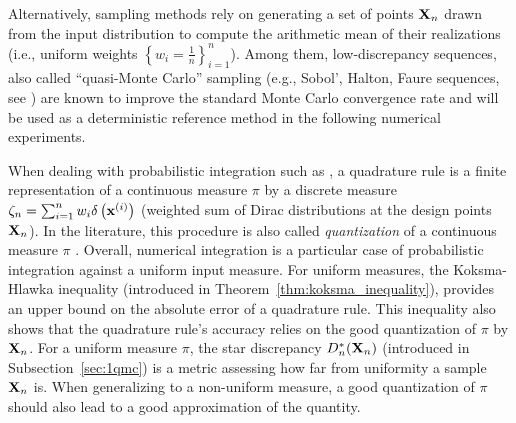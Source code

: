 Alternatively, sampling methods rely on generating a set of points ${\bf X}_n$ drawn from the input distribution to compute the arithmetic mean of their realizations (i.e., uniform weights $\left\{w_i = \frac1n \right\}_{i=1}^n$). 
Among them, low-discrepancy sequences, also called ``quasi-Monte Carlo'' sampling (e.g., Sobol', Halton, Faure sequences, see \citealp{leobacher_2014}) are known to improve the standard Monte Carlo convergence rate and will be used as a deterministic reference method in the following numerical experiments.

When dealing with probabilistic integration such as , a quadrature rule is a finite representation of a continuous measure $\pi$ by a discrete measure $\zeta_n = \sum_{i=1}^n w_i \delta\left({\bf x}^{(i)}\right)$ (weighted sum of Dirac distributions at the design points ${\bf X}_n$).
In the literature, this procedure is also called \emph{quantization} of a continuous measure $\pi$ \citep{briol_oates_2019}. 
Overall, numerical integration is a particular case of probabilistic integration against a uniform input measure. 
For uniform measures, the Koksma-Hlawka inequality (introduced in Theorem~\ref{thm:koksma_inequality}), provides an upper bound on the absolute error of a quadrature rule. 
This inequality also shows that the quadrature rule's accuracy relies on the good quantization of $\pi$ by ${\bf X}_n$. 
For a uniform measure $\pi$, the star discrepancy $D_n^*({\bf X}_n)$ (introduced in Subsection~\ref{sec:1qmc}) is a metric assessing how far from uniformity a sample ${\bf X}_n$ is. 
When generalizing to a non-uniform measure, a good quantization of $\pi$ should also lead to a good approximation of the quantity. 


